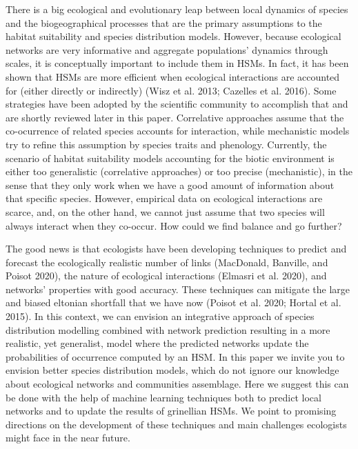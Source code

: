 \documentclass[12pt]{article}
\begin{document}
There is a big ecological and evolutionary leap between local dynamics
of species and the biogeographical processes that are the primary
assumptions to the habitat suitability and species distribution models.
However, because ecological networks are very informative and aggregate
populations' dynamics through scales, it is conceptually important to
include them in HSMs. In fact, it has been shown that HSMs are more
efficient when ecological interactions are accounted for (either
directly or indirectly) (Wisz et al. 2013; Cazelles et al. 2016). Some
strategies have been adopted by the scientific community to accomplish
that and are shortly reviewed later in this paper. Correlative
approaches assume that the co-ocurrence of related species accounts for
interaction, while mechanistic models try to refine this assumption by
species traits and phenology. Currently, the scenario of habitat
suitability models accounting for the biotic environment is either too
generalistic (correlative approaches) or too precise (mechanistic), in
the sense that they only work when we have a good amount of information
about that specific species. However, empirical data on ecological
interactions are scarce, and, on the other hand, we cannot just assume
that two species will always interact when they co-occur. How could we
find balance and go further?

The good news is that ecologists have been developing techniques to
predict and forecast the ecologically realistic number of links
(MacDonald, Banville, and Poisot 2020), the nature of ecological
interactions (Elmasri et al. 2020), and networks' properties with good
accuracy. These techniques can mitigate the large and biased eltonian
shortfall that we have now (Poisot et al. 2020; Hortal et al. 2015). In
this context, we can envision an integrative approach of species
distribution modelling combined with network prediction resulting in a
more realistic, yet generalist, model where the predicted networks
update the probabilities of occurrence computed by an HSM. In this paper
we invite you to envision better species distribution models, which do
not ignore our knowledge about ecological networks and communities
assemblage. Here we suggest this can be done with the help of machine
learning techniques both to predict local networks and to update the
results of grinellian HSMs. We point to promising directions on the
development of these techniques and main challenges ecologists might
face in the near future.
\end{document}
